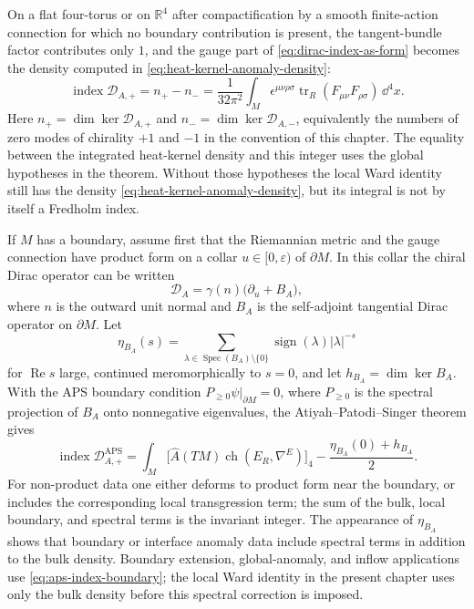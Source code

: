 On a flat four-torus or on \(\mathbb R^4\) after compactification by a smooth
finite-action connection for which no boundary contribution is present, the
tangent-bundle factor contributes only \(1\), and the gauge part of
\eqref{eq:dirac-index-as-form} becomes the density computed in
\eqref{eq:heat-kernel-anomaly-density}:
\begin{equation}
  \operatorname{index}\mathcal D_{A,+}
  =
  n_+-n_-
  =
  \frac1{32\pi^2}
  \int_M
  \epsilon^{\mu\nu\rho\sigma}
  \operatorname{tr}_{R}(F_{\mu\nu}F_{\rho\sigma})\,\dd^4x .
  \label{eq:dirac-index-anomaly}
\end{equation}
Here \(n_+=\dim\ker\mathcal D_{A,+}\) and
\(n_-=\dim\ker\mathcal D_{A,-}\), equivalently the numbers of zero modes of
chirality \(+1\) and \(-1\) in the convention of this chapter.  The equality
between the integrated heat-kernel density and this integer uses the global
hypotheses in the theorem.  Without those hypotheses the local Ward identity
still has the density \eqref{eq:heat-kernel-anomaly-density}, but its integral
is not by itself a Fredholm index.

If \(M\) has a boundary, assume first that the Riemannian metric and the gauge
connection have product form on a collar \(u\in[0,\varepsilon)\) of
\(\partial M\).  In this collar the chiral Dirac operator can be written
\[
  \mathcal D_A
  =
  \gamma(n)\bigl(\partial_u+B_A\bigr),
\]
where \(n\) is the outward unit normal and \(B_A\) is the self-adjoint
tangential Dirac operator on \(\partial M\).  Let
\[
  \eta_{B_A}(s)
  =
  \sum_{\lambda\in\operatorname{Spec}(B_A)\setminus\{0\}}
  \operatorname{sign}(\lambda)|\lambda|^{-s}
\]
for \(\operatorname{Re}s\) large, continued meromorphically to \(s=0\), and
let \(h_{B_A}=\dim\ker B_A\).  With the APS boundary condition
\(P_{\geq0}\psi|_{\partial M}=0\), where \(P_{\geq0}\) is the spectral
projection of \(B_A\) onto nonnegative eigenvalues, the Atiyah--Patodi--Singer
theorem gives
\begin{equation}
  \operatorname{index}\mathcal D^{\mathrm{APS}}_{A,+}
  =
  \int_M
  \bigl[\widehat A(TM)\operatorname{ch}(E_R,\nabla^E)\bigr]_4
  -
  \frac{\eta_{B_A}(0)+h_{B_A}}{2}.
  \label{eq:aps-index-boundary}
\end{equation}
For non-product data one either deforms to product form near the boundary, or
includes the corresponding local transgression term; the sum of the bulk,
local boundary, and spectral terms is the invariant integer.  The appearance
of \(\eta_{B_A}\) shows that boundary or interface anomaly data include
spectral terms in addition to the bulk density.  Boundary extension,
global-anomaly, and inflow applications use \eqref{eq:aps-index-boundary};
the local Ward identity in the present chapter uses only the bulk density
before this spectral correction is imposed.

